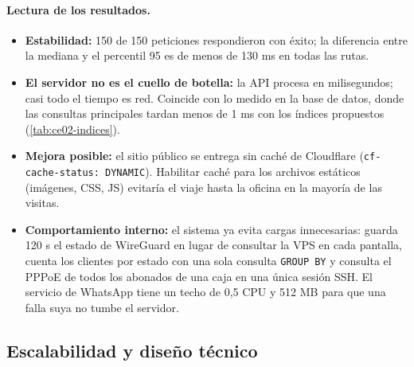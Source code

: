 \paragraph{Lectura de los resultados.}
\begin{itemize}
  \item \textbf{Estabilidad:} 150 de 150 peticiones respondieron con éxito; la diferencia
  entre la mediana y el percentil 95 es de menos de 130 ms en todas las rutas.
  \item \textbf{El servidor no es el cuello de botella:} la API procesa en milisegundos; casi
  todo el tiempo es red. Coincide con lo medido en la base de datos, donde las consultas
  principales tardan menos de 1 ms con los índices propuestos (\cref{tab:ce02-indices}).
  \item \textbf{Mejora posible:} el sitio público se entrega sin caché de Cloudflare
  (\texttt{cf-cache-status: DYNAMIC}). Habilitar caché para los archivos estáticos (imágenes,
  CSS, JS) evitaría el viaje hasta la oficina en la mayoría de las visitas.
  \item \textbf{Comportamiento interno:} el sistema ya evita cargas innecesarias: guarda 120 s
  el estado de WireGuard en lugar de consultar la VPS en cada pantalla, cuenta los clientes
  por estado con una sola consulta \texttt{GROUP BY} y consulta el PPPoE de todos los abonados
  de una caja en una única sesión SSH. El servicio de WhatsApp tiene un techo de 0,5 CPU y
  512 MB para que una falla suya no tumbe el servidor.
\end{itemize}

\subsection{Escalabilidad y diseño técnico}
\label{sec:ce02-e3-escalabilidad}

